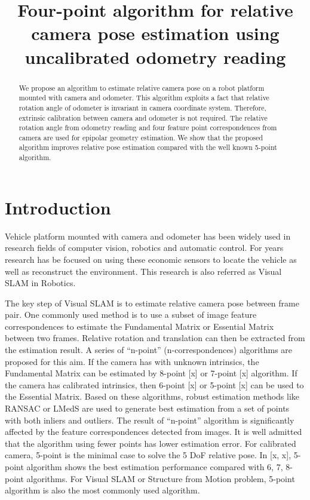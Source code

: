 \documentclass{article}
\title{Four-point algorithm for relative camera pose estimation using uncalibrated odometry reading}
\begin{document}
\maketitle

\begin{abstract}
We propose an algorithm to estimate relative camera pose on a robot platform mounted with camera and odometer. This algorithm exploits a fact that relative rotation angle of odometer is invariant in camera coordinate system. Therefore, extrinsic calibration between camera and odometer is not required. The relative rotation angle from odometry reading and four feature point correspondences from camera are used for epipolar geometry estimation. We show that the proposed algorithm improves relative pose estimation compared with the well known 5-point algorithm. 
\end{abstract}


\section{Introduction}
Vehicle platform mounted with camera and odometer has been widely used in research fields of computer vision, robotics and automatic control. For years research has be focused on using these economic sensors to locate the vehicle as well as reconstruct the environment. This research is also referred as Visual SLAM in Robotics. 

The key step of Visual SLAM is to estimate relative camera pose between frame pair. One commonly used method is to use a subset of image feature correspondences to estimate the Fundamental Matrix or Essential Matrix between two frames. Relative rotation and translation can then be extracted from the estimation result. A series of ``n-point'' (n-correspondences) algorithms are proposed for this aim. If the camera has with unknown intrinsics, the Fundamental Matrix can be estimated by 8-point [x] or 7-point [x] algorithm. If the camera has calibrated intrinsics, then 6-point [x] or 5-point [x] can be used to the Essential Matrix. Based on these algorithms, robust estimation methods like RANSAC or LMedS are used to generate best estimation from a set of points with both inliers and outliers. The result of ``n-point'' algorithm is significantly affected by the feature correspondences detected from images. It is well admitted that the algorithm using fewer points has lower estimation error. For calibrated camera, 5-point is the minimal case to solve the 5 DoF relative pose. In [x, x], 5-point algorithm shows the best estimation performance compared with 6, 7, 8-point algorithms. For Visual SLAM or Structure from Motion problem, 5-point algorithm is also the most commonly used algorithm. 
\end{document}
